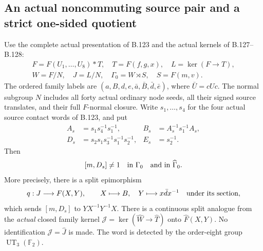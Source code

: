 \subsection*{An actual noncommuting source pair and a strict one-sided quotient}

\label{stmt:B131}
Use the complete actual presentation of B.123 and the actual kernels of
B.127--B.128:
\[
\begin{gathered}
 F=F(U_1,\ldots,U_8)*T,\quad T=F(f,g,x),\quad L=\ker(F\to T),\\
 W=F/N,\quad J=L/N,\quad \Gamma_0=W\rtimes S,\quad S=F(m,v).
\end{gathered}
\]
The ordered family labels are
$(a,B,d,e,\bar a,\bar B,\bar d,\bar e)$, where
$\bar U=cUc$. The normal subgroup $N$ includes all forty actual ordinary
node seeds, all their signed source translates, and their full
$F$-normal closure. Write $s_1,\ldots,s_4$ for the four actual source
contact words of B.123, and put
\begin{equation}\label{eq:B131-contact-basis}
\begin{aligned}
 A_s&=s_1s_4^{-1}s_1^{-1},&
 B_s&=A_s^{-1}s_1^{-1}A_s,\\
 D_s&=s_2s_1s_3^{-1}s_1^{-1}s_2^{-1},&
 E_s&=s_2^{-1}.
\end{aligned}
\end{equation}
Then
\begin{equation}\label{eq:B131-noncommutation}
 [m,D_s]\ne1\quad\hbox{in }\Gamma_0
 \quad\hbox{and in }\widehat\Gamma_0.
\end{equation}
More precisely, there is a split epimorphism
\begin{equation}\label{eq:B131-free-retract}
 q:J\longrightarrow F(X,Y),\qquad
 X\longmapsto B,\quad Y\longmapsto x\bar d x^{-1}
 \quad\hbox{under its section},
\end{equation}
which sends $[m,D_s]$ to $YX^{-1}Y^{-1}X$. There is a continuous split
analogue from the \emph{actual} closed family kernel
$\mathcal J=\ker(\widehat W\to\widehat T)$ onto
$\widehat F(X,Y)$. No identification $\mathcal J=\widehat J$ is made.
The word is detected by the order-eight group $\operatorname{UT}_3(\mathbb F_2)$.


